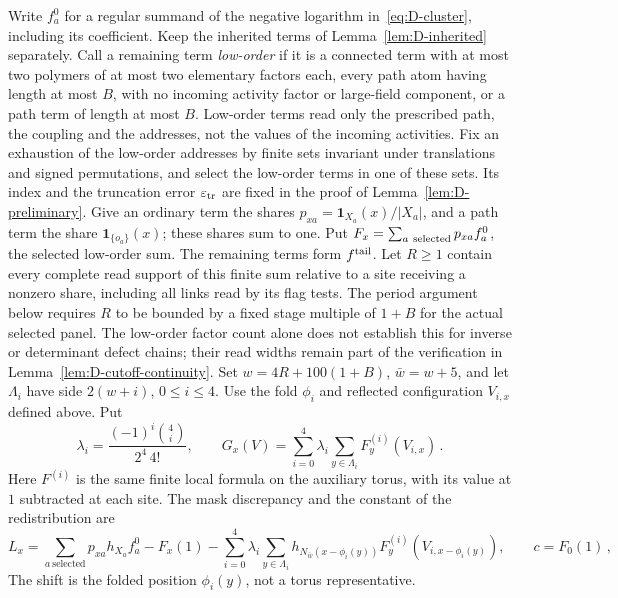 Write $f_a^0$ for a regular summand of the negative logarithm in~\eqref{eq:D-cluster}, including its coefficient. Keep the inherited terms of Lemma~\ref{lem:D-inherited} separately. Call a remaining term \emph{low-order} if it is a connected term with at most two polymers of at most two elementary factors each, every path atom having length at most $B$, with no incoming activity factor or large-field component, or a path term of length at most $B$. Low-order terms read only the prescribed path, the coupling and the addresses, not the values of the incoming activities. Fix an exhaustion of the low-order addresses by finite sets invariant under translations and signed permutations, and select the low-order terms in one of these sets. Its index and the truncation error $\varepsilon_{\rm tr}$ are fixed in the proof of Lemma~\ref{lem:D-preliminary}. Give an ordinary term the shares $p_{xa}=\mathbf1_{X_a}(x)/|X_a|$, and a path term the share $\mathbf1_{\{o_a\}}(x)$; these shares sum to one. Put $F_x=\sum_{a\ {\rm selected}}p_{xa}f_a^0$, the selected low-order sum. The remaining terms form $f^{\rm tail}$. Let $R\ge1$ contain every complete read support of this finite sum relative to a site receiving a nonzero share, including all links read by its flag tests. The period argument below requires $R$ to be bounded by a fixed stage multiple of $1+B$ for the actual selected panel. The low-order factor count alone does not establish this for inverse or determinant defect chains; their read widths remain part of the verification in Lemma~\ref{lem:D-cutoff-continuity}. Set $w=4R+100(1+B)$, $\bar w=w+5$, and let $\Lambda_i$ have side $2(w+i)$, $0\le i\le4$. Use the fold $\phi_i$ and reflected configuration $V_{i,x}$ defined above. Put
\begin{equation}\label{eq:D-five-weights}
\lambda_i=\frac{(-1)^i\binom4i}{2^4\,4!},\qquad
G_x(V)=\sum_{i=0}^4\lambda_i\sum_{y\in\Lambda_i}F^{(i)}_y(V_{i,x})\,.
\end{equation}
Here $F^{(i)}$ is the same finite local formula on the auxiliary torus, with its value at $1$ subtracted at each site. The mask discrepancy and the constant of the redistribution are
\begin{equation}\label{eq:D-mask-localization}
L_x=\sum_{a\ \text{selected}}p_{xa}h_{X_a}f_a^0-F_x(1)
-\sum_{i=0}^4\lambda_i\sum_{y\in\Lambda_i}
 h_{N_{\bar w}(x-\phi_i(y))}F^{(i)}_y(V_{i,x-\phi_i(y)}),
\qquad c=F_0(1)\,,
\end{equation}
The shift is the folded position $\phi_i(y)$, not a torus representative.

